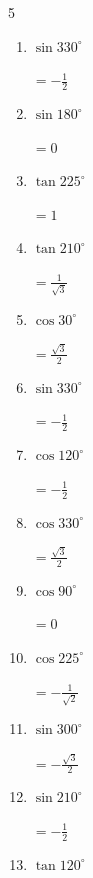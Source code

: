 \begin{multicols}{5}
\begin{enumerate}
        $\displaystyle =-\frac{\sqrt{3}}{2}$

  \item $\displaystyle \sin{330^\circ}$

        $\displaystyle =-\frac{1}{2}$

  \item $\displaystyle \sin{180^\circ}$

        $\displaystyle =0$

  \item $\displaystyle \tan{225^\circ}$

        $\displaystyle =1$

  \item $\displaystyle \tan{210^\circ}$

        $\displaystyle =\frac{1}{\sqrt{3}}$

  \item $\displaystyle \cos{30^\circ}$

        $\displaystyle =\frac{\sqrt{3}}{2}$

  \item $\displaystyle \sin{330^\circ}$

        $\displaystyle =-\frac{1}{2}$

\columnbreak %

\resetques

  \item $\displaystyle \cos{120^\circ}$

        $\displaystyle =-\frac{1}{2}$

  \item $\displaystyle \cos{330^\circ}$

        $\displaystyle =\frac{\sqrt{3}}{2}$

  \item $\displaystyle \cos{90^\circ}$

        $\displaystyle =0$

  \item $\displaystyle \cos{225^\circ}$

        $\displaystyle =-\frac{1}{\sqrt{2}}$

  \item $\displaystyle \sin{300^\circ}$

        $\displaystyle =-\frac{\sqrt{3}}{2}$

  \item $\displaystyle \sin{210^\circ}$

        $\displaystyle =-\frac{1}{2}$

  \item $\displaystyle \tan{120^\circ}$


\end{enumerate}
\end{multicols}
